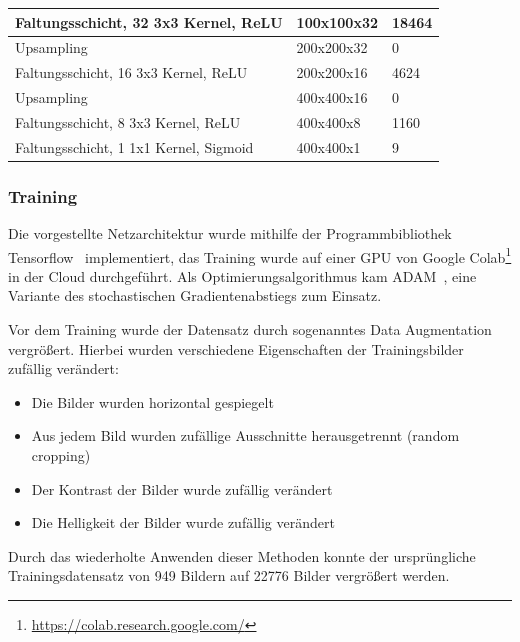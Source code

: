 \begin{table}
\begin{tabular}{|l|l|l|}
        \hline

        Faltungsschicht, 32 3x3 Kernel, ReLU   & 100x100x32                  & 18464                     \\

        \hline

        Upsampling                             & 200x200x32                  & 0                         \\

        \hline

        Faltungsschicht, 16 3x3 Kernel, ReLU   & 200x200x16                  & 4624                      \\

        \hline

        Upsampling                             & 400x400x16                  & 0                         \\

        \hline

        Faltungsschicht, 8 3x3 Kernel, ReLU    & 400x400x8                   & 1160                      \\

        \hline

        Faltungsschicht, 1 1x1 Kernel, Sigmoid & 400x400x1                   & 9                         \\

        \hline
    \end{tabular}
\end{table}

\subsubsection{Training}

Die vorgestellte Netzarchitektur wurde mithilfe der
Programmbibliothek Tensorflow~\cite{tensorflow2015-whitepaper}
implementiert,
das Training wurde auf einer GPU von Google
Colab\footnote{\url{https://colab.research.google.com/}} in der Cloud
durchgef\"uhrt.
Als Optimierungsalgorithmus kam ADAM~\cite{adam},
eine Variante des stochastischen Gradientenabstiegs zum Einsatz.

Vor dem Training wurde der Datensatz durch sogenanntes Data Augmentation
vergr\"o{\ss}ert. Hierbei wurden verschiedene Eigenschaften der
Trainingsbilder zuf\"allig ver\"andert:
\begin{itemize}
    \item Die Bilder wurden horizontal gespiegelt
    \item Aus jedem Bild wurden zuf\"allige Ausschnitte herausgetrennt (random cropping)
    \item Der Kontrast der Bilder wurde zuf\"allig ver\"andert
    \item Die Helligkeit der Bilder wurde zuf\"allig ver\"andert
\end{itemize}
Durch das wiederholte Anwenden dieser Methoden konnte der urspr\"ungliche
Trainingsdatensatz von 949 Bildern auf 22776 Bilder vergr\"o{\ss}ert werden.

